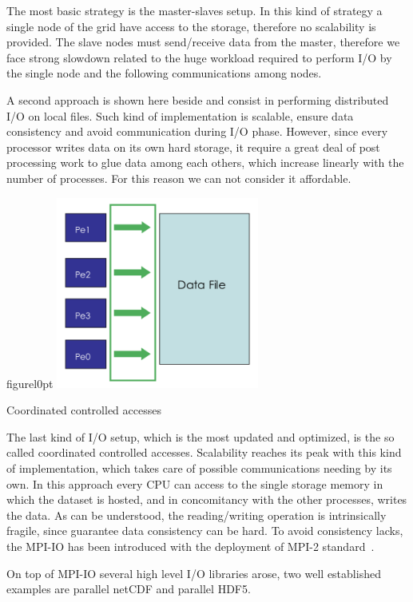 The most basic strategy is the master-slaves setup. In this kind of strategy a single node of the grid have access to the storage, therefore no scalability is provided. The slave nodes must send/receive data from the master, therefore we face strong slowdown related to the huge workload required to perform I/O by the single node and the following communications among nodes.\par
A second approach is shown here beside and consist in performing distributed I/O on local files. Such kind of implementation is scalable, ensure data consistency and avoid communication during I/O phase. However, since every processor writes data on its own hard storage, it require a great deal of post processing work to glue data among each others, which increase linearly with the number of processes. For this reason we can not consider it affordable. \\
\begin{wrapfloat}{figure}{l}{0pt}
\includegraphics[width=0.5\textwidth]{grafici/mpiio}
\caption{Coordinated controlled accesses}
\end{wrapfloat}
\par
The last kind of I/O setup, which is the most updated and optimized, is the so called coordinated controlled accesses.
Scalability reaches its peak with this kind of implementation, which takes care of possible communications needing by its own.
In this approach every CPU can access to the single storage memory in which the dataset is hosted, and in concomitancy with the other processes, writes the data. As can be understood, the reading/writing operation is intrinsically fragile, since guarantee data consistency can be hard. To avoid consistency lacks, the MPI-IO has been introduced with the deployment of MPI-2 standard~\cite{MPI:standard2}.

On top of MPI-IO several high level I/O libraries arose, two well established examples are parallel netCDF and parallel HDF5. 

